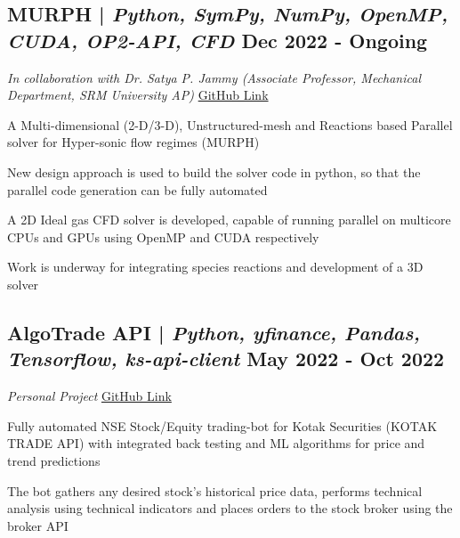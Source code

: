 \subsection{{MURPH | \textit{Python, SymPy, NumPy, OpenMP, CUDA, OP2-API, CFD} \hfill Dec 2022 - Ongoing}}
{\textit{In collaboration with Dr. Satya P. Jammy (Associate Professor, Mechanical Department, SRM University AP)} \hfill \href{https://github.com/UnstructuredFVM}{GitHub Link}}
\begin{zitemize}
\item {A Multi-dimensional (2-D/3-D), Unstructured-mesh and Reactions based Parallel solver for Hyper-sonic flow regimes (MURPH)}
\item {New design approach is used to build the solver code in python, so that the parallel code generation can be fully automated}
\item {A 2D Ideal gas CFD solver is developed, capable of running parallel on multicore CPUs and GPUs using OpenMP and CUDA respectively}
\item {Work is underway for integrating species reactions and development of a 3D solver}
\end{zitemize}


\subsection{{AlgoTrade API | \textit{Python, yfinance, Pandas, Tensorflow, ks-api-client} \hfill May 2022 - Oct 2022}}
{\textit{Personal Project} \hfill \href{https://github.com/vinay-ram1999/AlgoTrade-API}{GitHub Link}}
\begin{zitemize}
\item {Fully automated NSE Stock/Equity trading-bot for Kotak Securities (KOTAK TRADE API) with integrated back testing and ML algorithms for price and trend predictions}
\item {The bot gathers any desired stock's historical price data, performs technical analysis using technical indicators and places orders to the stock broker using the broker API}
\end{zitemize}



